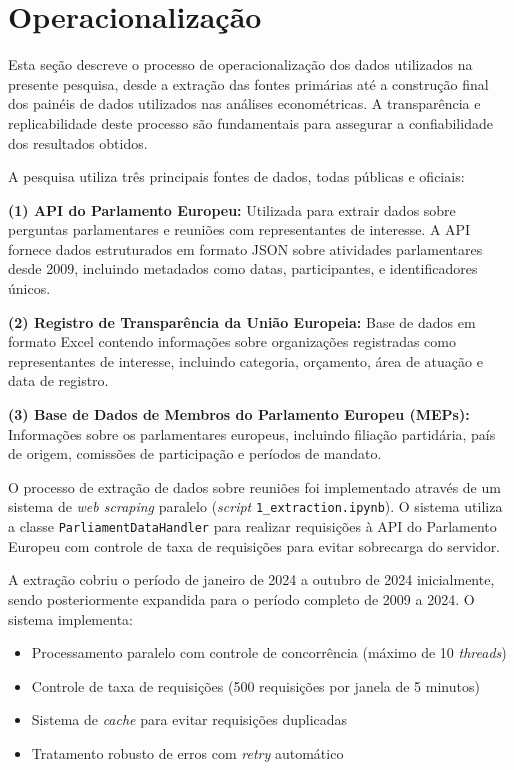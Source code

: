 \appendix

\chapter{Operacionalização}

\label{appendix:operationalization}

Esta seção descreve o processo de operacionalização dos dados utilizados na presente pesquisa, desde a extração das fontes primárias até a construção final dos painéis de dados utilizados nas análises econométricas. A transparência e replicabilidade deste processo são fundamentais para assegurar a confiabilidade dos resultados obtidos.

A pesquisa utiliza três principais fontes de dados, todas públicas e oficiais:

\textbf{(1) API do Parlamento Europeu:} Utilizada para extrair dados sobre perguntas parlamentares e reuniões com representantes de interesse. A API fornece dados estruturados em formato JSON sobre atividades parlamentares desde 2009, incluindo metadados como datas, participantes, e identificadores únicos.

\textbf{(2) Registro de Transparência da União Europeia:} Base de dados em formato Excel contendo informações sobre organizações registradas como representantes de interesse, incluindo categoria, orçamento, área de atuação e data de registro.

\textbf{(3) Base de Dados de Membros do Parlamento Europeu (MEPs):} Informações sobre os parlamentares europeus, incluindo filiação partidária, país de origem, comissões de participação e períodos de mandato.


O processo de extração de dados sobre reuniões foi implementado através de um sistema de \textit{web scraping} paralelo (\textit{script} \texttt{1\_extraction.ipynb}). O sistema utiliza a classe \texttt{ParliamentDataHandler} para realizar requisições à API do Parlamento Europeu com controle de taxa de requisições para evitar sobrecarga do servidor.

A extração cobriu o período de janeiro de 2024 a outubro de 2024 inicialmente, sendo posteriormente expandida para o período completo de 2009 a 2024. O sistema implementa:
\begin{itemize}
    \item Processamento paralelo com controle de concorrência (máximo de 10 \textit{threads})
    \item Controle de taxa de requisições (500 requisições por janela de 5 minutos)
    \item Sistema de \textit{cache} para evitar requisições duplicadas
    \item Tratamento robusto de erros com \textit{retry} automático
\end{itemize}

